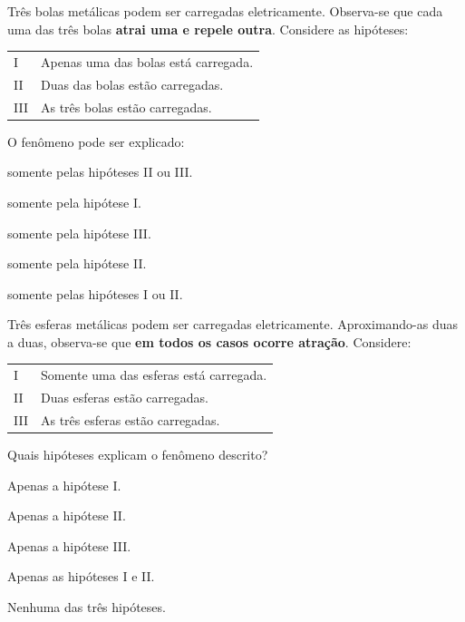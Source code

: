 \begin{questao}[2]{}

Três bolas metálicas podem ser carregadas eletricamente. Observa-se que cada uma
das três bolas \textbf{atrai uma e repele outra}. Considere as hipóteses:

\smallskip
\begin{tabular}{@{}ll@{}}
I   & Apenas uma das bolas está carregada.\\
II  & Duas das bolas estão carregadas.\\
III & As três bolas estão carregadas.\\
\end{tabular}
\smallskip

O fenômeno pode ser explicado:
\begin{alternativas}
\item somente pelas hipóteses II ou III.
\item somente pela hipótese I.
\item somente pela hipótese III.
\item somente pela hipótese II.
\item somente pelas hipóteses I ou II.
\end{alternativas}


\end{questao}
\begin{questao}[2]{}

Três esferas metálicas podem ser carregadas eletricamente. Aproximando-as duas a
duas, observa-se que \textbf{em todos os casos ocorre atração}. Considere:

\smallskip
\begin{tabular}{@{}ll@{}}
I   & Somente uma das esferas está carregada.\\
II  & Duas esferas estão carregadas.\\
III & As três esferas estão carregadas.\\
\end{tabular}
\smallskip

Quais hipóteses explicam o fenômeno descrito?
\begin{alternativas}
\item Apenas a hipótese I.
\item Apenas a hipótese II.
\item Apenas a hipótese III.
\item Apenas as hipóteses I e II.
\item Nenhuma das três hipóteses.
\end{alternativas}


\end{questao}

